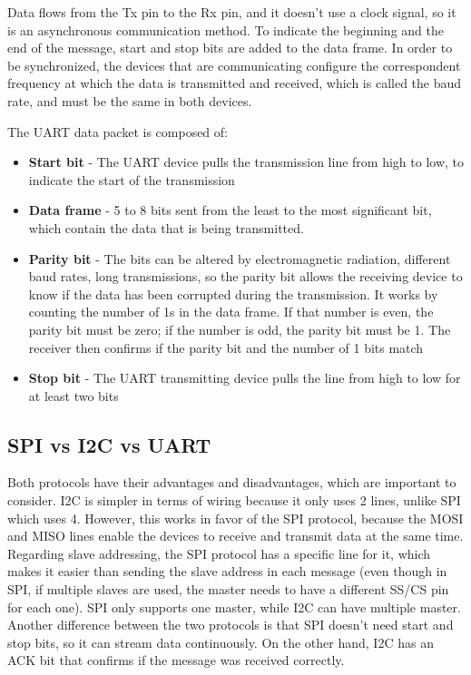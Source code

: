 \documentclass[english]{ist-thesis}
\begin{document}
Data flows from the Tx pin to the Rx pin, and it doesn't use a clock signal, so it is an asynchronous communication method. To indicate the beginning and the end of the message, start and stop bits are added to the data frame. In order to be synchronized, the devices that are communicating configure the correspondent frequency at which the data is transmitted and received, which is called the baud rate, and must be the same in both devices. 

The UART data packet is composed of:

\begin{itemize}
    \item \textbf{Start bit} - The UART device pulls the transmission line from high to low, to indicate the start of the transmission
    \item \textbf{Data frame} - 5 to 8 bits sent from the least to the most significant bit, which contain the data that is being transmitted.
    \item \textbf{Parity bit} -  The bits can be altered by electromagnetic radiation, different baud rates, long transmissions, so the parity bit allows the receiving device to know if the data has been corrupted during the transmission. It works by counting the number of 1s in the data frame. If that number is even, the parity bit must be zero; if the number is odd, the parity bit must be 1. The receiver then confirms if the parity bit and the number of 1 bits match
    \item \textbf{Stop bit} - The UART transmitting device pulls the line from high to low for at least two bits
\end{itemize}

\subsection{SPI vs I2C vs UART}

Both protocols have their advantages and disadvantages, which are important to consider. I2C is simpler in terms of wiring because it only uses 2 lines, unlike SPI which uses 4. However, this works in favor of the SPI protocol, because the MOSI and MISO lines enable the devices to receive and transmit data at the same time. 
Regarding slave addressing, the SPI protocol has a specific line for it, which makes it easier than sending the slave address in each message (even though in SPI, if multiple slaves are used, the master needs to have a different SS/CS pin for each one). SPI only supports one master, while I2C can have multiple master. 
Another difference between the two protocols is that SPI doesn't need start and stop bits, so it can stream data continuously. On the other hand, I2C has an ACK bit that confirms if the message was received correctly.
\end{document}
